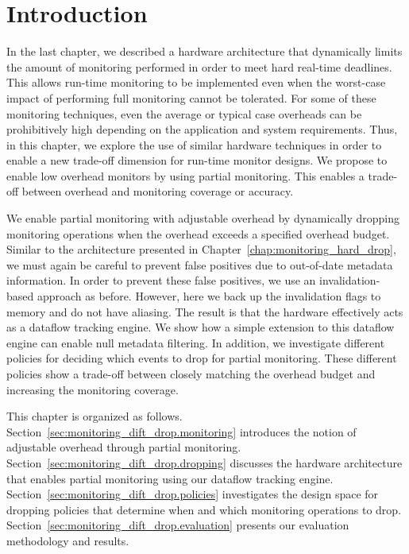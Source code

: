 \section{Introduction}
\label{sec:monitoring_dift_drop.introduction}

In the last chapter, we described a hardware architecture that dynamically
limits the amount of monitoring performed in order to meet hard real-time
deadlines. This allows run-time monitoring to be implemented even when the
worst-case impact of performing full monitoring cannot be tolerated. 
For some of these monitoring techniques, even the average or typical case
overheads can be prohibitively high depending on the application and system
requirements.  Thus, in this chapter, we explore the use of similar hardware
techniques in order to enable a new trade-off dimension for run-time monitor
designs.  We propose to enable low overhead monitors by using partial
monitoring. This enables a trade-off between overhead and
monitoring coverage or accuracy. 

We enable partial monitoring with adjustable overhead by dynamically dropping
monitoring operations when the overhead exceeds a specified overhead budget.
Similar to the architecture presented in
Chapter~\ref{chap:monitoring_hard_drop}, we must again be careful to prevent
false positives due to out-of-date metadata information. In order to prevent
these false positives, we use an invalidation-based approach as before.
However, here we back up the invalidation flags to memory and do not have
aliasing. The result is that the hardware effectively acts as a dataflow
tracking engine. We show how a simple extension to this dataflow engine can
enable null metadata filtering. In addition, we investigate different policies
for deciding which events to drop for partial monitoring.  These different
policies show a trade-off between closely matching the overhead budget and
increasing the monitoring coverage.

This chapter is organized as follows.
Section~\ref{sec:monitoring_dift_drop.monitoring} introduces the notion of
adjustable overhead through partial monitoring.
Section~\ref{sec:monitoring_dift_drop.dropping} discusses the hardware
architecture that enables partial monitoring using our dataflow tracking
engine.  Section~\ref{sec:monitoring_dift_drop.policies} investigates the
design space for dropping policies that determine when and which monitoring
operations to drop.  Section~\ref{sec:monitoring_dift_drop.evaluation} presents
our evaluation methodology and results. 

